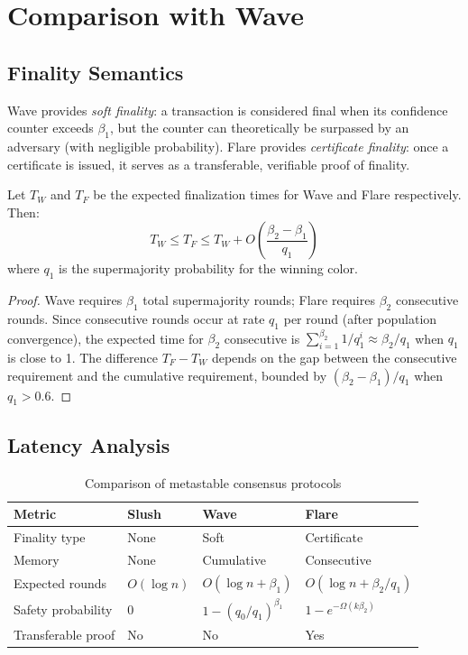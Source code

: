 \section{Comparison with Wave}

\label{sec:comparison}

\subsection{Finality Semantics}

Wave provides \emph{soft finality}: a transaction is considered final when its confidence
counter exceeds $\beta_1$, but the counter can theoretically be surpassed by an adversary
(with negligible probability). Flare provides \emph{certificate finality}: once a
certificate is issued, it serves as a transferable, verifiable proof of finality.

\begin{proposition}
\label{prop:finality}
Let $T_W$ and $T_F$ be the expected finalization times for Wave and Flare respectively.
Then:
\[
T_W \leq T_F \leq T_W + O\left(\frac{\beta_2 - \beta_1}{q_1}\right)
\]
where $q_1$ is the supermajority probability for the winning color.
\end{proposition}

\begin{proof}
Wave requires $\beta_1$ total supermajority rounds; Flare requires $\beta_2$ consecutive
rounds. Since consecutive rounds occur at rate $q_1$ per round (after population
convergence), the expected time for $\beta_2$ consecutive is $\sum_{i=1}^{\beta_2} 1/q_1^i
\approx \beta_2/q_1$ when $q_1$ is close to 1. The difference $T_F - T_W$ depends on
the gap between the consecutive requirement and the cumulative requirement, bounded by
$(\beta_2 - \beta_1)/q_1$ when $q_1 > 0.6$.
\end{proof}

\subsection{Latency Analysis}

\begin{table}[h]
\centering
\begin{tabular}{@{}llll@{}}
\toprule
\textbf{Metric} & \textbf{Slush} & \textbf{Wave} & \textbf{Flare} \\
\midrule
Finality type & None & Soft & Certificate \\
Memory & None & Cumulative & Consecutive \\
Expected rounds & $O(\log n)$ & $O(\log n + \beta_1)$ & $O(\log n + \beta_2/q_1)$ \\
Safety probability & $0$ & $1 - (q_0/q_1)^{\beta_1}$ & $1 - e^{-\Omega(k\beta_2)}$ \\
Transferable proof & No & No & Yes \\
\bottomrule
\end{tabular}
\caption{Comparison of metastable consensus protocols}
\label{tab:comparison}
\end{table}

